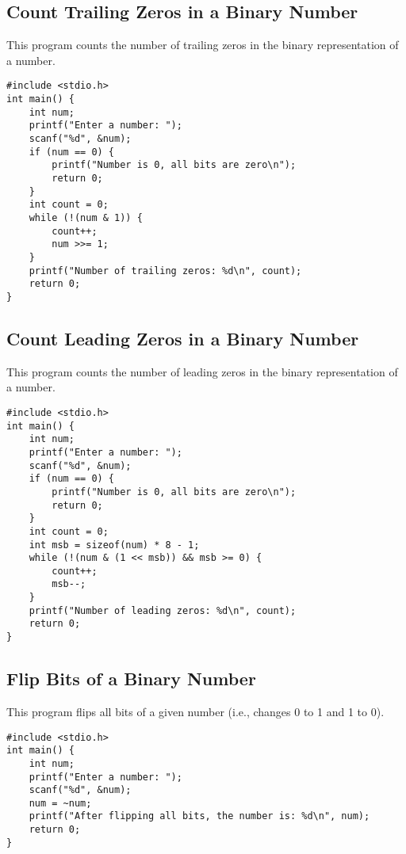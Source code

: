 \documentclass[a4paper,12pt]{article}
\begin{document}
\newpage

\subsection{Count Trailing Zeros in a Binary Number}
This program counts the number of trailing zeros in the binary representation of a number.

\begin{lstlisting}[caption={Count Trailing Zeros in a Binary Number}]
#include <stdio.h>
int main() {
    int num;
    printf("Enter a number: ");
    scanf("%d", &num);
    if (num == 0) {
        printf("Number is 0, all bits are zero\n");
        return 0;
    }
    int count = 0;
    while (!(num & 1)) {
        count++;
        num >>= 1;
    }
    printf("Number of trailing zeros: %d\n", count);
    return 0;
}
\end{lstlisting}

\newpage

\subsection{Count Leading Zeros in a Binary Number}
This program counts the number of leading zeros in the binary representation of a number.

\begin{lstlisting}[caption={Count Leading Zeros in a Binary Number}]
#include <stdio.h>
int main() {
    int num;
    printf("Enter a number: ");
    scanf("%d", &num);
    if (num == 0) {
        printf("Number is 0, all bits are zero\n");
        return 0;
    }
    int count = 0;
    int msb = sizeof(num) * 8 - 1;
    while (!(num & (1 << msb)) && msb >= 0) {
        count++;
        msb--;
    }
    printf("Number of leading zeros: %d\n", count);
    return 0;
}
\end{lstlisting}

\newpage

\subsection{Flip Bits of a Binary Number}
This program flips all bits of a given number (i.e., changes 0 to 1 and 1 to 0).

\begin{lstlisting}[caption={Flip Bits of a Binary Number}]
#include <stdio.h>
int main() {
    int num;
    printf("Enter a number: ");
    scanf("%d", &num);
    num = ~num;
    printf("After flipping all bits, the number is: %d\n", num);
    return 0;
}
\end{lstlisting}
\end{document}
